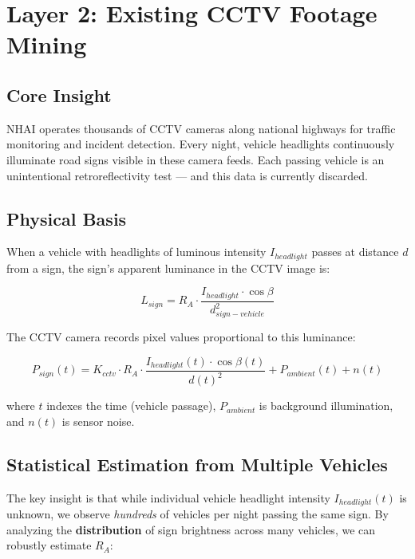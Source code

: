 \documentclass[11pt,a4paper]{article}
\begin{document}
\section{Layer 2: Existing CCTV Footage Mining}
\label{sec:layer2}

\subsection{Core Insight}

NHAI operates thousands of CCTV cameras along national highways for traffic monitoring and incident detection. Every night, vehicle headlights continuously illuminate road signs visible in these camera feeds. Each passing vehicle is an unintentional retroreflectivity test --- and this data is currently discarded.

\subsection{Physical Basis}

When a vehicle with headlights of luminous intensity $I_{headlight}$ passes at distance $d$ from a sign, the sign's apparent luminance in the CCTV image is:

\begin{equation}
L_{sign} = R_A \cdot \frac{I_{headlight} \cdot \cos\beta}{d_{sign-vehicle}^2}
\label{eq:cctv_luminance}
\end{equation}

The CCTV camera records pixel values proportional to this luminance:

\begin{equation}
P_{sign}(t) = K_{cctv} \cdot R_A \cdot \frac{I_{headlight}(t) \cdot \cos\beta(t)}{d(t)^2} + P_{ambient}(t) + n(t)
\label{eq:cctv_pixel}
\end{equation}

where $t$ indexes the time (vehicle passage), $P_{ambient}$ is background illumination, and $n(t)$ is sensor noise.

\subsection{Statistical Estimation from Multiple Vehicles}

The key insight is that while individual vehicle headlight intensity $I_{headlight}(t)$ is unknown, we observe \emph{hundreds} of vehicles per night passing the same sign. By analyzing the \textbf{distribution} of sign brightness across many vehicles, we can robustly estimate $R_A$:
\end{document}
